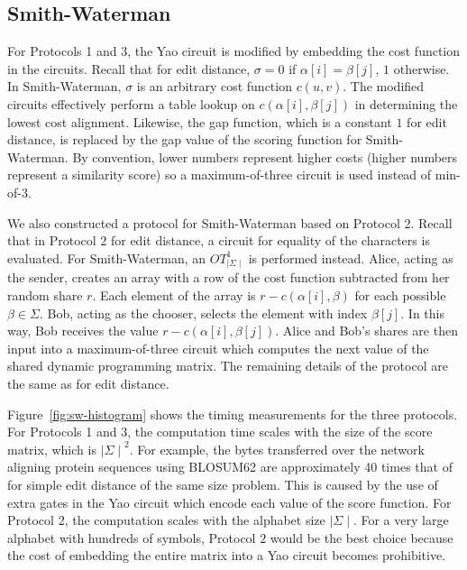 \subsection{Smith-Waterman}
\label{sec:sw-experimental}

For Protocols 1 and 3, the Yao circuit is modified by embedding the
cost function in the circuits. Recall that for edit distance, $\sigma=0$
if $\alpha[i]=\beta[j]$, $1$ otherwise. In Smith-Waterman, $\sigma$ is
an arbitrary cost function $c(u,v)$. The modified circuits effectively
perform a table lookup on $c(\alpha[i],\beta[j])$ in determining the
lowest cost alignment. Likewise, the gap function, which is a constant $1$
for edit distance, is replaced by the gap value of the scoring function
for Smith-Waterman. By convention, lower numbers represent higher costs
(higher numbers represent a similarity score) so a maximum-of-three circuit is
used instead of min-of-3.

We also constructed a protocol for Smith-Waterman based on Protocol
2. Recall that in Protocol $2$ for edit distance, a circuit for
equality of the characters is evaluated. For Smith-Waterman, an
$OT_{\mid \Sigma \mid}^{1}$ is performed instead. Alice, acting as the sender,
creates an array with a row of the cost function subtracted from her
random share $r$.  Each element of the array is $r-c(\alpha[i],\beta)$
for each possible $\beta\in\Sigma$. Bob, acting as the chooser, selects
the element with index $\beta[j]$. In this way, Bob receives the value
$r-c(\alpha[i],\beta[j])$.  Alice and Bob's shares are then input into
a maximum-of-three circuit which computes the next value of the shared dynamic
programming matrix.  The remaining details of the protocol are the same
as for edit distance.


Figure~\ref{fig:sw-histogram} shows the timing measurements for the
three protocols.  For Protocols 1 and 3, the computation time scales
with the size of the score matrix, which is ${\mid \Sigma \mid}^{2}$. For
example, the bytes transferred over the network aligning protein
sequences using BLOSUM62 are approximately 40 times that of for simple
edit distance of the same size problem.  This is caused by the use of
extra gates in the Yao circuit which encode each value of the score
function.  For Protocol 2, the computation scales with the alphabet
size $\mid \Sigma \mid$. For a very large alphabet with hundreds of symbols,
Protocol $2$ would be the best choice because the cost of embedding
the entire matrix into a Yao circuit becomes prohibitive.


